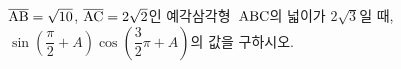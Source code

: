 $\overline{\mathrm{AB}}=\sqrt{10}$, $\overline{\mathrm{AC}}=2\sqrt{2}$인 예각삼각형~$\mathrm{ABC}$의 넓이가 $2\sqrt{3}$일 때, $\sin\left(\dfrac{\pi}{2}+A\right)\cos\left(\dfrac{3}{2}\pi+A\right)$의 값을 구하시오.
